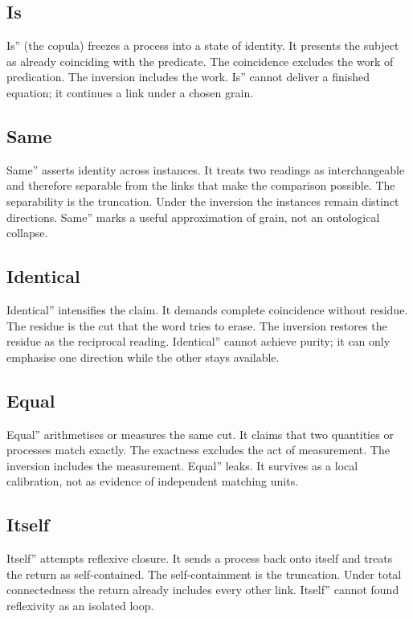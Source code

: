 \documentclass[11pt,a4paper]{article}
\begin{document}
\subsection{Is} Is'' (the copula) freezes a process into a state of identity. It presents the subject as already coinciding with the predicate. The coincidence excludes the work of predication. The inversion includes the work. Is'' cannot deliver a finished equation; it continues a link under a chosen grain.

\subsection{Same} Same'' asserts identity across instances. It treats two readings as interchangeable and therefore separable from the links that make the comparison possible. The separability is the truncation. Under the inversion the instances remain distinct directions. Same'' marks a useful approximation of grain, not an ontological collapse.

\subsection{Identical} Identical'' intensifies the claim. It demands complete coincidence without residue. The residue is the cut that the word tries to erase. The inversion restores the residue as the reciprocal reading. Identical'' cannot achieve purity; it can only emphasise one direction while the other stays available.

\subsection{Equal} Equal'' arithmetises or measures the same cut. It claims that two quantities or processes match exactly. The exactness excludes the act of measurement. The inversion includes the measurement. Equal'' leaks. It survives as a local calibration, not as evidence of independent matching units.

\subsection{Itself} Itself'' attempts reflexive closure. It sends a process back onto itself and treats the return as self-contained. The self-containment is the truncation. Under total connectedness the return already includes every other link. Itself'' cannot found reflexivity as an isolated loop.
\end{document}
